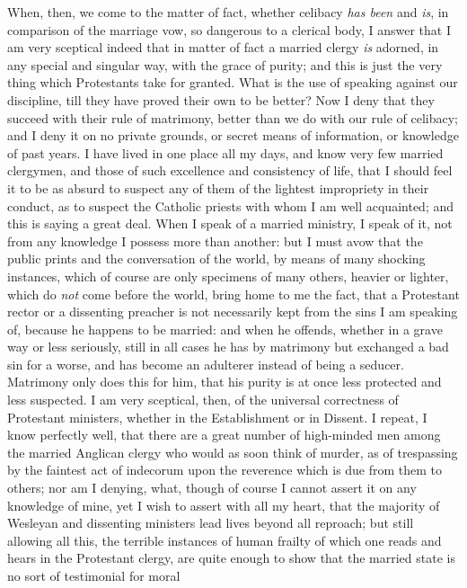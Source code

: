 When, then, we come to the matter of fact, whether
celibacy \emph{has been} and \emph{is}, in comparison
of the marriage vow, so dangerous to a clerical body, I
answer that I am very sceptical indeed that in matter of
fact a married clergy \emph{is} adorned, in any special
and singular way, with the grace of purity; and this is
just the very thing which Protestants take for granted.
What is the use of speaking against our discipline, till
they have proved their own to be better? Now I deny that
they succeed with their rule of matrimony, better than we
do with our rule of celibacy; and I deny it on no private
grounds, or secret means of information, or knowledge of
past years. I have lived in one place all my days, and
know very few married clergymen, and those of such
excellence and consistency of life, that I should feel it
to be as absurd to suspect any of them of the lightest
impropriety in their conduct, as to suspect the Catholic
priests with whom I am well acquainted; and this is
saying a great deal. When I speak of a married ministry,
I speak of it, not from any knowledge I possess more than
another: but I must avow that the public prints and the
conversation of the world, by means of many shocking
instances, which of course are only specimens of many
others, heavier or lighter, which do \emph{not} come
before the world, bring home to me the fact, that a
Protestant rector or a dissenting preacher is not
necessarily kept from the sins I am speaking of, because
he happens to be married: and when he offends, whether in
a grave way or less seriously, still in all cases he has
by matrimony but exchanged a bad sin for a worse, and has
become an adulterer instead of being a seducer. Matrimony
only does this for him, that his purity is at once less
protected and less suspected. I am very sceptical, then,
of the universal correctness of Protestant ministers,
whether in the Establishment or in Dissent. I repeat, I
know perfectly well, that there are a great number of
high-minded men among the married Anglican clergy who
would as soon think of murder, as of trespassing by the
faintest act of indecorum upon the reverence which is due
from them to others; nor am I denying, what, though of
course I cannot assert it on any knowledge of mine, yet I
wish to assert with all my heart, that the majority of
Wesleyan and dissenting ministers lead lives beyond all
reproach; but still allowing all this, the terrible
instances of human frailty of which one reads and hears
in the Protestant clergy, are quite enough to show that
the married state is no sort of testimonial for moral
